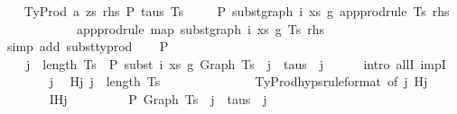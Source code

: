 \begin{isabellebody}
\isanewline
{}\isamarkupfalse%
\isanewline
\ \ \isamarkupfalse%
\ {\isacharparenleft}{\kern0pt}TyProd\ a\ zs\ rhs\ P\ taus\ Ts\ {\isasymGamma}{\isacharparenright}{\kern0pt}\isanewline
\ \ \isamarkupfalse%
\ P{}{\isacharcolon}{\kern0pt}\ {\isachardoublequoteopen}subst{\isacharunderscore}{\kern0pt}graph\ i\ xs\ g{}\ {\isacharparenleft}{\kern0pt}app{\isacharunderscore}{\kern0pt}prodrule\ Ts\ rhs{\isacharparenright}{\kern0pt}\ {\isacharequal}{\kern0pt}\isanewline
\ \ \ \ \ \ \ \ \ \ \ \ app{\isacharunderscore}{\kern0pt}prodrule\ {\isacharparenleft}{\kern0pt}map\ {\isacharparenleft}{\kern0pt}subst{\isacharunderscore}{\kern0pt}graph\ i\ xs\ g{}{\isacharparenright}{\kern0pt}\ Ts{\isacharparenright}{\kern0pt}\ rhs{\isachardoublequoteclose}\isanewline
\ \ \ \ \ \ \isamarkupfalse%
\ {\isacharparenleft}{\kern0pt}simp\ add{\isacharcolon}{\kern0pt}\ subst{\isacharunderscore}{\kern0pt}typrod{\isacharparenright}{\kern0pt}\isanewline
\isanewline
\ \ \isamarkupfalse%
\ P{}{}{\isacharcolon}{\kern0pt}\isanewline
\ \ \ \ {\isachardoublequoteopen}{\isasymforall}j\ {\isacharless}{\kern0pt}\ length\ Ts{\isachardot}{\kern0pt}\ {\isasymGamma}{}\ {\isasymturnstile}{\isacharbraceleft}{\kern0pt}P{\isacharbraceright}{\kern0pt}\ subst\ i\ xs\ g{}\ {\isacharparenleft}{\kern0pt}Graph\ {\isacharparenleft}{\kern0pt}Ts\ {\isacharbang}{\kern0pt}\ j{\isacharparenright}{\kern0pt}{\isacharparenright}{\kern0pt}\ {\isacharcolon}{\kern0pt}\ taus\ {\isacharbang}{\kern0pt}\ j{\isachardoublequoteclose}\isanewline
\ \ \ \ \isamarkupfalse%
\ {\isacharparenleft}{\kern0pt}intro\ allI\ impI{\isacharparenright}{\kern0pt}\isanewline
\ \ \ \ \ \ \isamarkupfalse%
\ j\ \isamarkupfalse%
\ Hj{\isacharcolon}{\kern0pt}\ {\isachardoublequoteopen}j\ {\isacharless}{\kern0pt}\ length\ Ts{\isachardoublequoteclose}\isanewline
\isanewline
\ \ \ \ \ \ \isanewline
\ \ \ \ \ \ \isamarkupfalse%
\ TyProd{\isachardot}{\kern0pt}hyps{\isacharparenleft}{\kern0pt}{}{\isacharparenright}{\kern0pt}{\isacharbrackleft}{\kern0pt}rule{\isacharunderscore}{\kern0pt}format{\isacharcomma}{\kern0pt}\ of\ j{\isacharbrackright}{\kern0pt}\ Hj\isanewline
\ \ \ \ \ \ \isamarkupfalse%
\ IHj{\isacharcolon}{\kern0pt}\isanewline
\ \ \ \ \ \ \ \ {\isachardoublequoteopen}{\isasymGamma}\ {\isasymturnstile}{\isacharbraceleft}{\kern0pt}P{\isacharbraceright}{\kern0pt}\ Graph\ {\isacharparenleft}{\kern0pt}Ts\ {\isacharbang}{\kern0pt}\ j{\isacharparenright}{\kern0pt}\ {\isacharcolon}{\kern0pt}\ taus\ {\isacharbang}{\kern0pt}\ j\ {\isasymand}\isanewline

\end{isabellebody}
